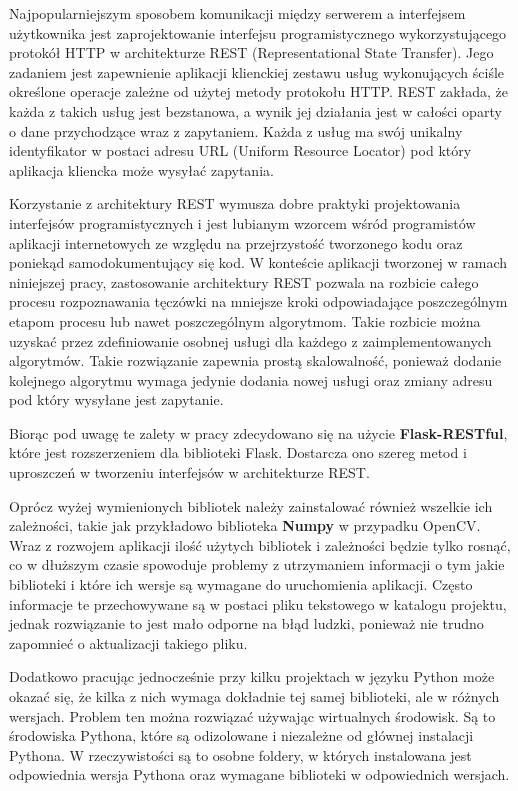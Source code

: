 \documentclass[10pt,polish,a4paper,oneside]{ppfcmthesis}
\begin{document}
Najpopularniejszym sposobem komunikacji między serwerem a interfejsem użytkownika jest zaprojektowanie
interfejsu programistycznego wykorzystującego protokół HTTP w architekturze REST (Representational State Transfer).
Jego zadaniem jest zapewnienie aplikacji klienckiej zestawu usług wykonujących ściśle określone
operacje zależne od użytej metody protokołu HTTP. REST zakłada, że każda z takich usług jest bezstanowa, a wynik jej działania jest w całości
oparty o dane przychodzące wraz z zapytaniem. Każda z usług ma swój unikalny identyfikator w postaci
adresu URL (Uniform Resource Locator) pod który aplikacja kliencka może wysyła\'c zapytania.

Korzystanie z architektury REST wymusza dobre praktyki projektowania interfejsów programistycznych
i jest lubianym wzorcem wśród programistów aplikacji internetowych ze względu na przejrzystoś\'c
tworzonego kodu oraz poniekąd samodokumentujący się kod.
W konteście aplikacji tworzonej w ramach niniejszej pracy, zastosowanie architektury REST pozwala
na rozbicie całego procesu rozpoznawania tęczówki na mniejsze kroki odpowiadające poszczególnym
etapom procesu lub nawet poszczególnym algorytmom. Takie rozbicie można uzyska\'c przez zdefiniowanie
osobnej usługi dla każdego z zaimplementowanych algorytmów. Takie rozwiązanie zapewnia prostą skalowalnoś\'c,
ponieważ dodanie kolejnego algorytmu wymaga jedynie dodania nowej usługi oraz zmiany adresu pod który
wysyłane jest zapytanie.

Biorąc pod uwagę te zalety w pracy zdecydowano
się na użycie \textbf{Flask-RESTful}, które jest rozszerzeniem dla biblioteki Flask. Dostarcza
ono szereg metod i uproszczeń w tworzeniu interfejsów w architekturze REST.\newline

Oprócz wyżej wymienionych bibliotek należy zainstalowa\'c również wszelkie ich zależności, takie jak
przykładowo biblioteka \textbf{Numpy} w przypadku OpenCV. Wraz z rozwojem aplikacji iloś\'c użytych
bibliotek i zależności będzie tylko rosną\'c, co w dłuższym czasie spowoduje problemy z utrzymaniem
informacji o tym jakie biblioteki i które ich wersje są wymagane do uruchomienia aplikacji. Często
informacje te przechowywane są w postaci pliku tekstowego w katalogu projektu, jednak rozwiązanie to
jest mało odporne na błąd ludzki, ponieważ nie trudno zapomnie\'c o aktualizacji takiego pliku.

Dodatkowo pracując jednocześnie przy kilku projektach w języku Python może okaza\'c się, że kilka z
nich wymaga dokładnie tej samej biblioteki, ale w różnych wersjach. Problem ten można rozwiąza\'c
używając wirtualnych środowisk. Są to środowiska Pythona, które są odizolowane i niezależne od głównej
instalacji Pythona. W rzeczywistości są to osobne foldery, w których instalowana jest odpowiednia wersja
Pythona oraz wymagane biblioteki w odpowiednich wersjach.
\end{document}
